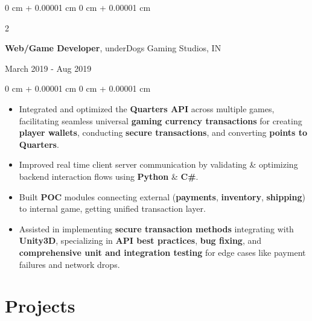 \documentclass[10pt, letterpaper]{article}
\newenvironment{highlights}{
    \begin{itemize}[
        topsep=0.10 cm,
        parsep=0.10 cm,
        partopsep=0pt,
        itemsep=0pt,
        leftmargin=0 cm + 10pt
    ]
}{
    \end{itemize}
} %
\newenvironment{onecolentry}{
    \begin{adjustwidth}{
        0 cm + 0.00001 cm
    }{
        0 cm + 0.00001 cm
    }
}{
    \end{adjustwidth}
} %
\newenvironment{twocolentry}[2][]{
    \onecolentry
    \def\secondColumn{#2}
    \setcolumnwidth{\fill, 4.5 cm}
    \begin{paracol}{2}
}{
    \switchcolumn \raggedleft \secondColumn
    \end{paracol}
    \endonecolentry
} %
\begin{document}
\vspace{0.15 cm}
\begin{twocolentry}{
	March 2019 - Aug 2019
}
\textbf{Web/Game Developer}, underDogs Gaming Studios, IN
\end{twocolentry}

\begin{onecolentry}
\begin{highlights}
	\item Integrated and optimized the \textbf{Quarters API} across multiple games, facilitating seamless universal \textbf{gaming currency transactions} for creating \textbf{player wallets}, conducting \textbf{secure transactions}, and converting \textbf{points to Quarters}.
	\item Improved real time client server communication by validating \& optimizing backend interaction flows using \textbf{Python} \& \textbf{C\#}.
	\item Built \textbf{POC} modules connecting external (\textbf{payments}, \textbf{inventory}, \textbf{shipping}) to internal game, getting unified transaction layer.
	\item Assisted in implementing \textbf{secure transaction methods} integrating with \textbf{Unity3D}, specializing in \textbf{API best practices}, \textbf{bug fixing}, and \textbf{comprehensive unit and integration testing} for edge cases like payment failures and network drops.
\end{highlights}
\end{onecolentry}




\vspace{0.2 cm}


\section{Projects}
\vspace{0.05 cm}
\end{document}
